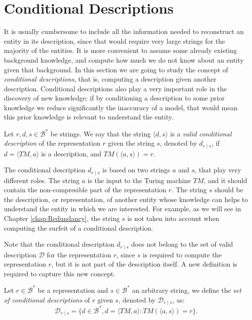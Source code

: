 %
%

\section{Conditional Descriptions}

It is usually cumbersome to include all the information needed to reconstruct an entity in its description, since that would require very large strings for the majority of the entities. It is more convenient to assume some already existing background knowledge, and compute how much we do not know about an entity given that background. In this section we are going to study the concept of \emph{conditional descriptions}, that is, computing a description given another description. Conditional descriptions also play a very important role in the discovery of new knowledge: if by conditioning a description to some prior knowledge we reduce significantly the inaccuracy of a model, that would mean this prior knowledge is relevant to understand the entity.

\begin{definition}
\label{def:conditional_description}
Let $r, d, s \in \mathcal{B}^\ast$ be strings. We say that the string $\langle d, s \rangle$ is a \emph{valid conditional description} of the representation $r$ given the string $s$, denoted by $d_{r \mid s}$, if $d = \langle TM, a \rangle$ is a description, and $TM \left(\langle a, s \rangle \right) = r$.
\end{definition}

The conditional description $d_{r \mid s}$ is based on two strings $a$ and $s$, that play very different roles. The string $a$ is the input to the Turing machine $TM$,  and it should contain the non-compresible part of the representation $r$. The string $s$ should be the description, or representation, of another entity whose knowledge can helps to understand the entity in which we are interested. For example, as we will see in Chapter \ref{chap:Redundancy}, the string $s$ is not taken into account when computing the surfeit of a conditional description.

Note that the conditional description $d_{r \mid s}$ does not belong to the set of valid description $\mathcal{D}$ for the representation $r$, since $s$ is required to compute the representation $r$, but it is not part of the description itself. A new definition is required to capture this new concept.

\begin{definition}
Let $r \in \mathcal{B}^\ast$ be a representation and $s \in \mathcal{B}^\ast$ an arbitrary string, we define the \emph{set of conditional descriptions} of $r$ given $s$, denoted by $\mathcal{D}_{r \mid s}$, as:
\[
\mathcal{D}_{r \mid s} = \{ d \in \mathcal{B}^\ast, d = \langle TM, a \rangle : TM \left(\langle a, s \rangle \right) = r \}.
\]
\end{definition}


